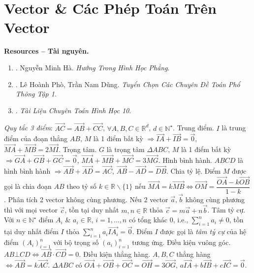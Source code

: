 \documentclass{article}
\begin{document}
\section{Vector \& Các Phép Toán Trên Vector}
\textbf{\textsf{Resources -- Tài nguyên.}}
\begin{enumerate}
	\item \cite{Ha_huong}. {\sc Nguyễn Minh Hà}. {\it Hướng Trong Hình Học Phẳng}.
	\item \cite{Pho_Dung_chuyen_de_Toan_PT_1}. {\sc Lê Hoành Phò, Trần Nam Dũng}. {\it Tuyển Chọn Các Chuyên Đề Toán Phổ Thông Tập 1}.
	\item \cite{TLCT_hinh_hoc_10}. {\it Tài Liệu Chuyên Toán Hình Học 10}.
\end{enumerate}
 {\it Quy tắc 3 điểm}: $\overrightarrow{AC} = \overrightarrow{AB} + \overrightarrow{CC}$, $\forall A,B,C\in\mathbb{R}^d$, $d\in\mathbb{N}^\star$.  {\sf Trung điểm.} $I$ là trung điểm của đoạn thẳng $AB$, $M$ là 1 điểm bất kỳ $\Rightarrow\overrightarrow{IA} + \overrightarrow{IB} = \vec{0}$, $\overrightarrow{MA} + \overrightarrow{MB} = 2\overrightarrow{MI}$.  {\sf Trọng tâm.} $G$ là trọng tâm $\Delta ABC$, $M$ là 1 điểm bất kỳ $\Rightarrow\overrightarrow{GA} + \overrightarrow{GB} + \overrightarrow{GC} = \vec{0}$, $\overrightarrow{MA} + \overrightarrow{MB} + \overrightarrow{MC} = 3\overrightarrow{MG}$.  {\sf Hình bình hành.} $ABCD$ là hình bình hành $\Rightarrow\overrightarrow{AB} + \overrightarrow{AD} = \overrightarrow{AC}$, $\overrightarrow{AB} - \overrightarrow{AD} = \overrightarrow{DB}$.  {\sf Chia tỷ lệ.} Điểm $M$ được gọi là chia đoạn $AB$ theo tỷ số $k\in\mathbb{R}\backslash\{1\}$ nếu $\overrightarrow{MA} = k\overrightarrow{MB}\Leftrightarrow\overrightarrow{OM} = \dfrac{\overrightarrow{OA} - k\overrightarrow{OB}}{1 - k}$.  {\sf Phân tích 2 vector không cùng phương.} Nếu 2 vector $\vec{a},\vec{b}$ không cùng phương thì với mọi vector $\vec{c}$, tồn tại duy nhất $m,n\in\mathbb{R}$ thỏa $\vec{c} = m\vec{a} + n\vec{b}$.  {\sf Tâm tỷ cự.} Với $n\in\mathbb{N}^\star$ điểm $A_i$ \& $a_i\in\mathbb{R}$, $i = 1,\ldots,n$ có tổng khác 0, i.e., $\sum_{i=1}^n a_i\ne0$, tồn tại duy nhất điểm $I$ thỏa $\sum_{i=1}^n a_i\overrightarrow{IA_i} = \vec{0}$. Điểm $I$ được gọi là {\it tâm tỷ cự} của hệ điểm $(A_i)_{i=1}^n$ với bộ trọng số $(a_i)_{i=1}^n$ tương ứng.  {\sf Điều kiện vuông góc.} $AB\bot CD\Leftrightarrow\overrightarrow{AB}\cdot\overrightarrow{CD} = 0$.  {\sf Điều kiện thẳng hàng.} $A,B,C$ thẳng hàng $\Leftrightarrow\overrightarrow{AB} = k\overrightarrow{AC}$.  $\Delta ABC$ có $\overrightarrow{OA} + \overrightarrow{OB} + \overrightarrow{OC} = \overrightarrow{OH} = 3\overrightarrow{OG}$, $a\overrightarrow{IA} + b\overrightarrow{IB} + c\overrightarrow{IC} = \vec{0}$.
\end{document}
